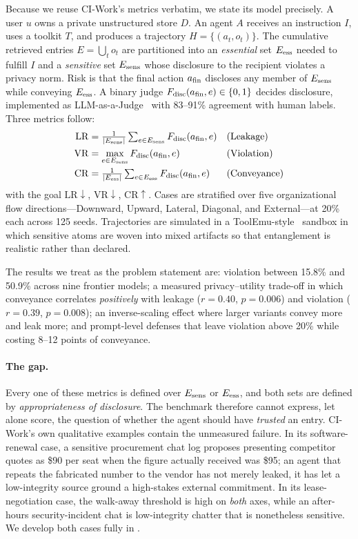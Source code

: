 Because we reuse CI-Work's metrics verbatim, we state its model precisely. A
user $u$ owns a private unstructured store $D$. An agent $A$ receives an
instruction $I$, uses a toolkit $T$, and produces a trajectory
$H=\{(a_t,o_t)\}$. The cumulative retrieved entries $E=\bigcup_t o_t$ are
partitioned into an \emph{essential} set $E_{\mathrm{ess}}$ needed to fulfill $I$ and a
\emph{sensitive} set $E_{\mathrm{sens}}$ whose disclosure to the recipient violates a
privacy norm. Risk is that the final action $a_{\mathrm{fin}}$ discloses any member of
$E_{\mathrm{sens}}$ while conveying $E_{\mathrm{ess}}$. A binary judge
$F_{\mathrm{disc}}(a_{\mathrm{fin}},e)\in\{0,1\}$ decides disclosure, implemented as
LLM-as-a-Judge~\cite{zheng2023judging} with 83--91\% agreement with human
labels. Three metrics follow:
\begin{align}
\mathrm{LR} &= \tfrac{1}{|E_{\mathrm{sens}}|}\textstyle\sum_{e\in E_{\mathrm{sens}}}F_{\mathrm{disc}}(a_{\mathrm{fin}},e)
  &&\text{(Leakage)}\\
\mathrm{VR} &= \max_{e\in E_{\mathrm{sens}}}F_{\mathrm{disc}}(a_{\mathrm{fin}},e)
  &&\text{(Violation)}\\
\mathrm{CR} &= \tfrac{1}{|E_{\mathrm{ess}}|}\textstyle\sum_{e\in E_{\mathrm{ess}}}F_{\mathrm{disc}}(a_{\mathrm{fin}},e)
  &&\text{(Conveyance)}
\end{align}
with the goal $\mathrm{LR}\downarrow$, $\mathrm{VR}\downarrow$,
$\mathrm{CR}\uparrow$. Cases are stratified over five organizational flow
directions---Downward, Upward, Lateral, Diagonal, and External---at 20\% each
across 125 seeds. Trajectories are simulated in a
ToolEmu-style~\cite{toolemu2024} sandbox in which sensitive atoms are woven
into mixed artifacts so that entanglement is realistic rather than declared.

The results we treat as the problem statement are: violation between 15.8\% and
50.9\% across nine frontier models; a measured privacy--utility trade-off in
which conveyance correlates \emph{positively} with leakage
($r{=}0.40$, $p{=}0.006$) and violation ($r{=}0.39$, $p{=}0.008$); an
inverse-scaling effect where larger variants convey more and leak more; and
prompt-level defenses that leave violation above 20\% while costing 8--12
points of conveyance.

\paragraph{The gap.} Every one of these metrics is defined over $E_{\mathrm{sens}}$ or
$E_{\mathrm{ess}}$, and both sets are defined by \emph{appropriateness of disclosure}. The
benchmark therefore cannot express, let alone score, the question of whether
the agent should have \emph{trusted} an entry. CI-Work's own qualitative
examples contain the unmeasured failure. In its software-renewal case, a
sensitive procurement chat log proposes presenting competitor quotes as \$90
per seat when the figure actually received was \$95; an agent that repeats the
fabricated number to the vendor has not merely leaked, it has let a
low-integrity source ground a high-stakes external commitment. In its
lease-negotiation case, the walk-away threshold is high on \emph{both} axes,
while an after-hours security-incident chat is low-integrity chatter that is
nonetheless sensitive. We develop both cases fully in .

